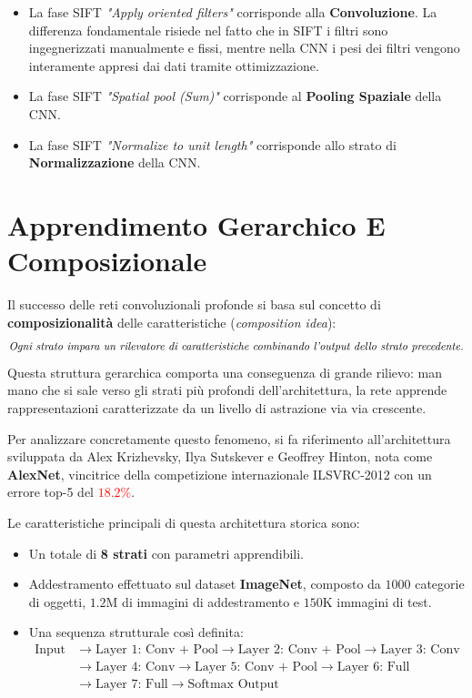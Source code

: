 ﻿\documentclass[11pt, a4paper]{article}
\begin{document}
\begin{itemize}
    \item La fase SIFT \emph{"Apply oriented filters"} corrisponde alla \textbf{Convoluzione}. La differenza fondamentale risiede nel fatto che in SIFT i filtri sono ingegnerizzati manualmente e fissi, mentre nella CNN i pesi dei filtri vengono interamente appresi dai dati tramite ottimizzazione.
    \item La fase SIFT \emph{"Spatial pool (Sum)"} corrisponde al \textbf{Pooling Spaziale} della CNN.
    \item La fase SIFT \emph{"Normalize to unit length"} corrisponde allo strato di \textbf{Normalizzazione} della CNN.
\end{itemize}

\newpage

\section{Apprendimento Gerarchico E Composizionale}

Il successo delle reti convoluzionali profonde si basa sul concetto di \textbf{composizionalità} delle caratteristiche (\emph{composition idea}):
\[
\text{\emph{Ogni strato impara un rilevatore di caratteristiche combinando l'output dello strato precedente.}}
\]
Questa struttura gerarchica comporta una conseguenza di grande rilievo: man mano che si sale verso gli strati più profondi dell'architettura, la rete apprende rappresentazioni caratterizzate da un livello di astrazione via via crescente.

Per analizzare concretamente questo fenomeno, si fa riferimento all'architettura sviluppata da Alex Krizhevsky, Ilya Sutskever e Geoffrey Hinton, nota come \textbf{AlexNet}, vincitrice della competizione internazionale ILSVRC-2012 con un errore top-5 del \textcolor{red}{$18.2\%$}.

Le caratteristiche principali di questa architettura storica sono:
\begin{itemize}
    \item Un totale di \textbf{8 strati} con parametri apprendibili.
    \item Addestramento effettuato sul dataset \textbf{ImageNet}, composto da $1000$ categorie di oggetti, $1.2\text{M}$ di immagini di addestramento e $150\text{K}$ immagini di test.
    \item Una sequenza strutturale così definita:
    \begin{align*}
    \text{Input} &\longrightarrow \text{Layer 1: Conv + Pool} \longrightarrow \text{Layer 2: Conv + Pool} \longrightarrow \text{Layer 3: Conv} \\
    &\longrightarrow \text{Layer 4: Conv} \longrightarrow \text{Layer 5: Conv + Pool} \longrightarrow \text{Layer 6: Full} \\
    &\longrightarrow \text{Layer 7: Full} \longrightarrow \text{Softmax Output}
    \end{align*}
\end{itemize}
\end{document}
